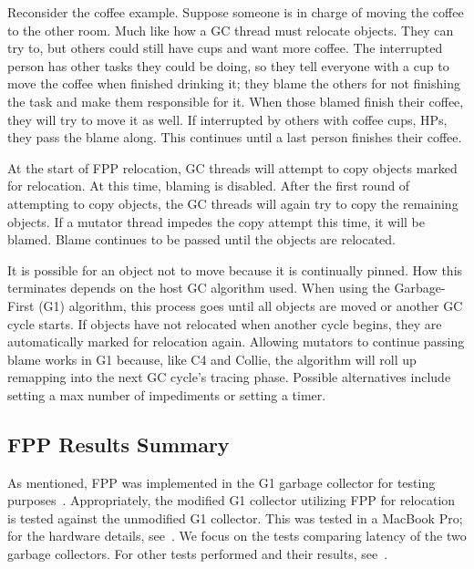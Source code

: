 \documentclass{sig-alternate}
\begin{document}
Reconsider the coffee example. Suppose
someone is in charge of moving the coffee to the other room.
Much like how a GC thread must relocate objects. They
can try to, but others could still have cups and want more coffee.
The interrupted person has other tasks they could be doing, so they tell
everyone with a cup to move the coffee when finished drinking it;
they blame the others for not finishing the task and make them responsible
for it. When those blamed finish their coffee, they will try to
move it as well. If interrupted by others with coffee cups, HPs, they
pass the blame along. This continues until a last person finishes 
their coffee.

At the start of FPP relocation, GC threads will attempt to copy
objects marked for relocation. At this time, blaming is 
disabled. 
After the first round of attempting to copy objects, the GC threads
will again try to copy the remaining objects. If a mutator 
thread impedes the copy attempt this time, it will be blamed.
Blame continues to be passed until the objects are relocated. 

It is possible for an
object not to move because it is continually pinned. How this terminates 
depends on the host GC algorithm used. When using the Garbage-First (G1) algorithm,
this process goes until all objects are moved or another GC cycle starts.
If objects have not relocated when another cycle begins, they are automatically
marked for relocation again. Allowing mutators to continue passing blame works
in G1 because, like C4 and Collie, the algorithm will roll up remapping into the next
GC cycle's tracing phase. Possible alternatives include setting a max number of impediments
or setting a timer.


\subsection{FPP Results Summary}
\label{sec:fppResults}


As mentioned, FPP was implemented in the G1 garbage collector for testing purposes~\cite{Osterlund:FPP}. 
Appropriately, the modified G1 collector utilizing FPP for relocation is tested against the
unmodified G1 collector. This was tested in a MacBook Pro; for the 
hardware details, see~\cite{Osterlund:FPP}. We focus on the tests comparing
latency of the two garbage collectors. For other tests performed and their results, see~\cite{Osterlund:FPP}.
\end{document}
